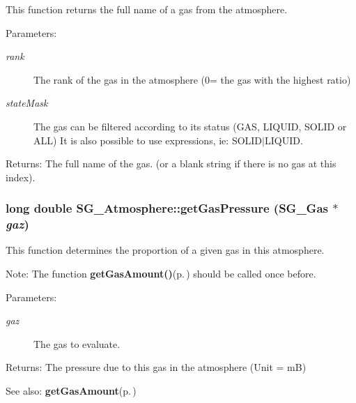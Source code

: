 This function returns the full name of a gas from the atmosphere. 

\begin{Desc}
\item[Parameters:]
\begin{description}
\item[{\em rank}]The rank of the gas in the atmosphere (0= the gas with the highest ratio) \item[{\em state\-Mask}]The gas can be filtered according to its status (GAS, LIQUID, SOLID or ALL) It is also possible to use expressions, ie: SOLID$|$LIQUID. \end{description}
\end{Desc}
\begin{Desc}
\item[Returns:]The full name of the gas. (or a blank string if there is no gas at this index). \end{Desc}
\subsubsection{\setlength{\rightskip}{0pt plus 5cm}long double SG\_\-Atmosphere::get\-Gas\-Pressure ({\bf SG\_\-Gas} $\ast$ {\em gaz})\hspace{0.3cm}{\tt  [protected]}}\label{class_s_g___atmosphere_b5}


This function determines the proportion of a given gas in this atmosphere. 

Note: The function {\bf get\-Gas\-Amount()}{\rm (p.\,\pageref{class_s_g___atmosphere_b4})} should be called once before. \begin{Desc}
\item[Parameters:]
\begin{description}
\item[{\em gaz}]The gas to evaluate. \end{description}
\end{Desc}
\begin{Desc}
\item[Returns:]The pressure due to this gas in the atmosphere (Unit = m\-B) \end{Desc}
\begin{Desc}
\item[See also:]{\bf get\-Gas\-Amount}{\rm (p.\,\pageref{class_s_g___atmosphere_b4})} \end{Desc}
